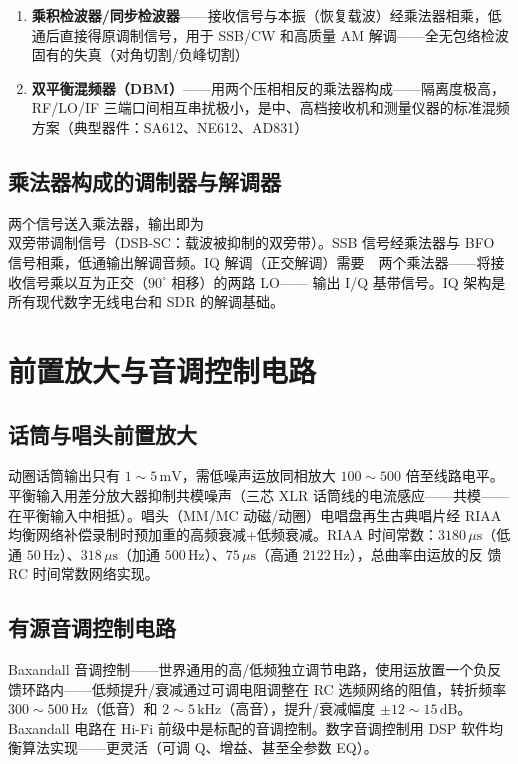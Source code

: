 \documentclass[12pt,UTF8]{ctexbook}
\begin{document}
\begin{enumerate}
\item \textbf{乘积检波器/同步检波器}——接收信号与本振（恢复载波）经乘法器相乘，低通后直接得原调制信号，用于 SSB/CW 和高质量 AM 解调——全无包络检波固有的失真（对角切割/负峰切割）
\item \textbf{双平衡混频器（DBM）}——用两个压相相反的乘法器构成——隔离度极高，RF/LO/IF 三端口间相互串扰极小，是中、高档接收机和测量仪器的标准混频方案（典型器件：SA612、NE612、AD831）
\end{enumerate}

\subsection{乘法器构成的调制器与解调器}

两个信号送入乘法器，输出即为\\双旁带调制信号（DSB-SC：载波被抑制的双旁带）。SSB 信号经乘法器与 BFO 信号相乘，低通输出解调音频。IQ 解调（正交解调）需要~~两个乘法器——将接收信号乘以互为正交（$90^\circ$ 相移）的两路 LO—— 输出 I/Q 基带信号。IQ 架构是所有现代数字无线电台和 SDR 的解调基础。

\section{前置放大与音调控制电路}
\label{sec:preamp_tone_control}

\subsection{话筒与唱头前置放大}

动圈话筒输出只有 $1\sim5\,\mathrm{mV}$，需低噪声运放同相放大 $100\sim500$ 倍至线路电平。平衡输入用差分放大器抑制共模噪声（三芯 XLR 话筒线的电流感应——共模——在平衡输入中相抵）。唱头（MM/MC 动磁/动圈）电唱盘再生古典唱片经 RIAA 均衡网络补偿录制时预加重的高频衰减+低频衰减。RIAA 时间常数：$3180\,\mu\mathrm{s}$（低通 $50\,\mathrm{Hz}$）、$318\,\mu\mathrm{s}$（加通 $500\,\mathrm{Hz}$）、$75\,\mu\mathrm{s}$（高通 $2122\,\mathrm{Hz}$），总曲率由运放的反
馈 RC 时间常数网络实现。

\subsection{有源音调控制电路}

Baxandall 音调控制——世界通用的高/低频独立调节电路，使用运放置一个负反馈环路内——低频提升/衰减通过可调电阻调整在 RC 选频网络的阻值，转折频率 $300\sim500\,\mathrm{Hz}$（低音）和 $2\sim5\,\mathrm{kHz}$（高音），提升/衰减幅度 $\pm12\sim15\,\mathrm{dB}$。Baxandall 电路在 Hi-Fi 前级中是标配的音调控制。数字音调控制用 DSP 软件均衡算法实现——更灵活（可调 Q、增益、甚至全参数 EQ）。
\end{document}
